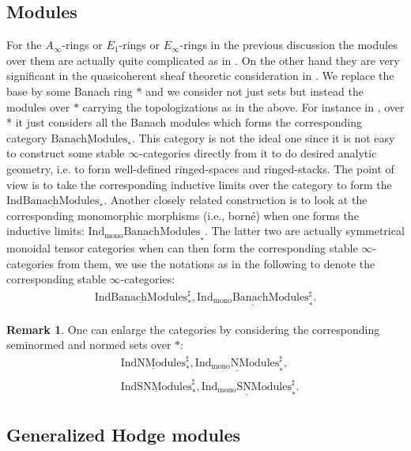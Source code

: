 \documentclass[12pt]{article}
\theoremstyle{definition}
\newtheorem{remark}{Remark}
\begin{document}
\subsection{Modules}

For the $A_\infty$-rings or $E_1$-rings or $E_\infty$-rings in the previous discussion the modules over them are actually quite complicated as in \cite{BBK}. On the other hand they are very significant in the quasicoherent sheaf theoretic consideration in \cite{BBK}. We replace the base by some Banach ring $*$ and we consider not just sets but instead the modules over $*$ carrying the topologizations as in the above. For instance in \cite{BBBK}, over $*$ it just considers all the Banach modules which forms the corresponding category $\underline{\mathrm{BanachModules}}_*$. This category is not the ideal one since it is not easy to construct some stable $\infty$-categories directly from it to do desired analytic geometry, i.e. to form well-defined ringed-spaces and ringed-stacks. The point of view is to take the corresponding inductive limits over the category to form the $\underline{\mathrm{IndBanachModules}}_*$. Another closely related construction is to look at the corresponding monomorphic morphisms (i.e., born\'e) when one forms the inductive limits: $\underline{\mathrm{Ind_{\mathrm{mono}}BanachModules}}_*$. The latter two are actually symmetrical monoidal tensor categories when can then form the corresponding stable $\infty$-categories from them, we use the notations as in the following to denote the corresponding stable $\infty$-categories:
\begin{align}
\underline{\mathrm{IndBanachModules}}^\sharp_*, \underline{\mathrm{Ind_{\mathrm{mono}}BanachModules}}^\sharp_*.
\end{align}

\begin{remark}
One can enlarge the categories by considering the corresponding seminormed and normed sets over $*$:
\begin{align}
&\underline{\mathrm{IndNModules}}^\sharp_*, \underline{\mathrm{Ind_{\mathrm{mono}}NModules}}^\sharp_*,\\
&\underline{\mathrm{IndSNModules}}^\sharp_*, \underline{\mathrm{Ind_{\mathrm{mono}}SNModules}}^\sharp_*.
\end{align}
\end{remark}


\subsection{Generalized Hodge modules}
\end{document}
